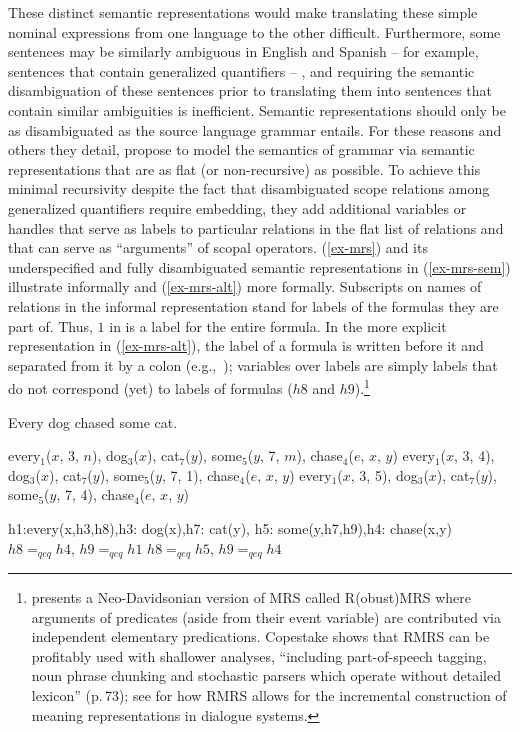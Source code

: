 \documentclass[output=paper]{langsci/langscibook}
\begin{document}
These distinct semantic representations would make translating these simple nominal expressions from one language to the other difficult. Furthermore, some sentences may be similarly ambiguous in English and Spanish -- for example, sentences that contain generalized quantifiers -- , and requiring the semantic disambiguation of these sentences prior to translating them into sentences that contain similar ambiguities is inefficient. Semantic representations should only be as disambiguated as the source language grammar entails. For these reasons and others they detail, \citet{Copestakeetal1995} propose to model the semantics of grammar via semantic representations that are as flat (or non-recursive) as possible. To achieve this minimal recursivity despite the fact that disambiguated scope relations among generalized quantifiers require embedding, they add additional variables or handles that serve as labels to particular relations in the flat list of relations and that can serve as ``arguments'' of scopal operators. (\ref{ex-mrs}) and its underspecified and fully disambiguated semantic representations in (\ref{ex-mrs-sem}) illustrate informally and (\ref{ex-mrs-alt}) more formally. Subscripts on names of relations in the informal representation stand for labels of the formulas they are part of. Thus, $1$ in  is a label for the entire formula. In the more explicit representation in (\ref{ex-mrs-alt}), the label of a formula is written before it and separated from it by a colon (e.g., \,); variables over labels are simply labels that do not correspond (yet) to labels of formulas ($h8$ and $h9$).\footnote{\citet{Copestake2007} presents a Neo-Davidsonian version of MRS called R(obust)MRS where arguments of predicates (aside from their event variable) are contributed via independent elementary predications. Copestake shows that RMRS can be profitably used with shallower analyses, ``including part-of-speech tagging, noun phrase chunking and stochastic parsers which operate without detailed lexicon'' (p.\,73); see \citet{PeldzusandSchlangen2012} for how RMRS allows for the incremental construction of meaning representations in dialogue systems.}

\begin{exe}
\ex\label{ex-mrs}
Every dog chased some cat.
\ex\label{ex-mrs-sem}
\begin{xlist}
\ex\label{ex-mrs-sem-a}
every$_{1}$($x$, 3, $n$), dog$_{3}$($x$), cat$_{7}$($y$), some$_{5}$($y$, 7, $m$), chase$_{4}$($e$, $x$, $y$)
\ex\label{ex-mrs-sem-b}
every$_{1}$($x$, 3, 4), dog$_{3}$($x$), cat$_{7}$($y$), some$_{5}$($y$, 7, 1), chase$_{4}$($e$, $x$, $y$)
\ex\label{ex-mrs-sem-c}
every$_{1}$($x$, 3, 5), dog$_{3}$($x$), cat$_{7}$($y$), some$_{5}$($y$, 7, 4), chase$_{4}$($e$, $x$, $y$)
\end{xlist}
\ex\label{ex-mrs-alt}
\begin{xlist}
\ex\label{ex-mrs-alt-a}
h1:every(x,h3,h8),h3: dog(x),h7: cat(y), h5: some(y,h7,h9),h4: chase(x,y)
\ex\label{ex-mrs-alt-b}
$h8=_{qeq}h4$, $h9=_{qeq}h1$
\ex\label{ex-mrs-alt-c}
$h8=_{qeq}h5$, $h9=_{qeq}h4$
\end{xlist}
\end{exe} 
\end{document}
